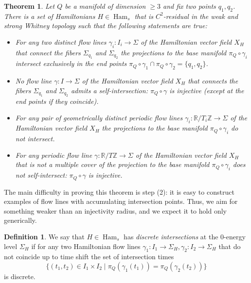 \documentclass{amsart}
\newcommand{\NN}{\mathbb{N}}
\newcommand{\RR}{\mathbb{R}}
\newcommand{\ZZ}{\mathbb{Z}}
\newcommand{\Ham}{\operatorname{Ham}}
\newtheorem{theorem}{Theorem}
\theoremstyle{definition}
\newtheorem{definition}[proposition]{Definition}
\theoremstyle{remark}
\numberwithin{equation}{section}
\begin{document}

\begin{theorem}\label{thm:Main1}
    Let $Q$ be a manifold of dimension $\geq 3$ and fix two points $q_1, q_2$. There is a set of Hamiltonians $H\in\Ham_s$ that is $C^2$-residual in the weak and strong Whitney topology such that the following statements are true:
    \begin{itemize}
        \item For any two distinct flow lines $\gamma_i:I_i\to\Sigma$ of the Hamiltonian vector field $X_H$ that connect the fibers $\Sigma_{q_1}$ and $\Sigma_{q_2}$ the projections to the base manifold $\pi_Q\circ \gamma_i$ intersect exclusively in the end points $\pi_Q\circ\gamma_1\cap \pi_Q\circ\gamma_2=\{q_1,q_2\}$. 
        \item No flow line $\gamma:I\to\Sigma$ of the Hamiltonian vector field $X_H$ that connects the fibers $\Sigma_{q_1}$ and $\Sigma_{q_2}$ admits a self-intersection: $\pi_Q\circ \gamma$ is injective (except at the end points if they coincide).
        \item For any pair of geometrically distinct periodic flow lines $\gamma_i:\RR/T_i\ZZ\to\Sigma$ of the Hamiltonian vector field $X_H$ the projections to the base manifold $\pi_Q\circ\gamma_i$ do not intersect.
        \item For any periodic flow line $\gamma:\RR/T\ZZ\to\Sigma$ of the Hamiltonian vector field $X_H$ that is not a multiple cover of the projection to the base manifold $\pi_Q\circ\gamma_i$ does not self-intersect: $\pi_Q\circ \gamma$ is injective.
    \end{itemize} 
\end{theorem}

The main difficulty in proving this theorem is step (2): it is easy to construct examples of flow lines with accumulating intersection points. Thus, we aim for something weaker than an injectivity radius, and we expect it to hold only generically.

\begin{definition}
    We say that $H\in\Ham_s$ has \emph{discrete intersections} at the 0-energy level $\Sigma_H$ if for any two Hamiltonian flow lines $\gamma_1:I_1\to\Sigma_H,\gamma_2:I_2\to \Sigma_H$ that do not coincide up to time shift the set of intersection times $$\{(t_1,t_2)\in I_1\times I_2 \mid \pi_Q(\gamma_1(t_1))=\pi_Q(\gamma_2(t_2))\}$$
    is discrete.
\end{definition}
\end{document}
